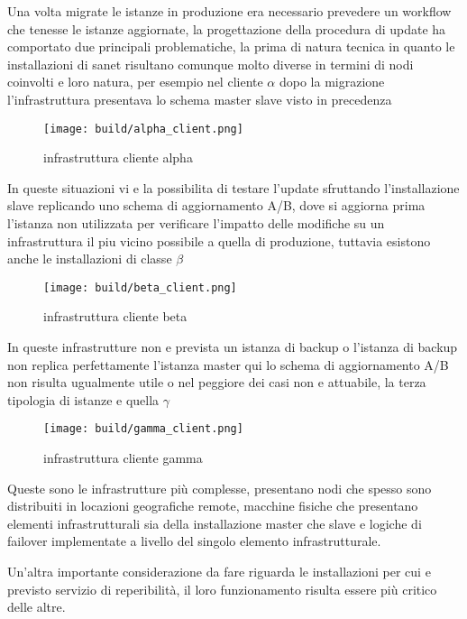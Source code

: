 Una volta migrate le istanze in produzione era necessario prevedere un workflow che tenesse le istanze aggiornate, la progettazione della procedura di update ha comportato due principali problematiche, la prima di natura tecnica in quanto le installazioni di sanet risultano comunque molto diverse in termini di nodi coinvolti e loro natura, per esempio nel cliente \(\alpha\) dopo la migrazione l'infrastruttura presentava lo schema master slave visto in precedenza

\begin{figure}[H]
    \centering
    \texttt{[image: build/alpha\_client.png]}
    \caption{infrastruttura cliente alpha}
    \label{fig:enter-label}
\end{figure}

In queste situazioni vi e la possibilita di testare l'update sfruttando l'installazione slave replicando uno schema di aggiornamento A/B, dove si aggiorna prima l'istanza non utilizzata per verificare l'impatto delle modifiche su un infrastruttura il piu vicino possibile a quella di produzione, tuttavia esistono anche le installazioni di classe \(\beta\)

\begin{figure}[H]
    \centering
    \texttt{[image: build/beta\_client.png]}
    \caption{infrastruttura cliente beta}
    \label{fig:enter-label}
\end{figure}

In queste infrastrutture non e prevista un istanza di backup o l'istanza di backup non replica perfettamente l'istanza master qui lo schema di aggiornamento A/B non risulta ugualmente utile o nel peggiore dei casi non e attuabile, la terza tipologia di istanze e quella \(\gamma\)

\begin{figure}[H]
    \centering
    \texttt{[image: build/gamma\_client.png]}
    \caption{infrastruttura cliente gamma}
    \label{fig:enter-label}
\end{figure}

Queste sono le infrastrutture più complesse, presentano nodi che spesso sono distribuiti in locazioni geografiche remote, macchine fisiche che presentano elementi infrastrutturali sia della installazione master che slave e logiche di failover implementate a livello del singolo elemento infrastrutturale.

Un'altra importante considerazione da fare riguarda le installazioni per cui e previsto servizio di reperibilità, il loro funzionamento risulta essere più critico delle altre.

